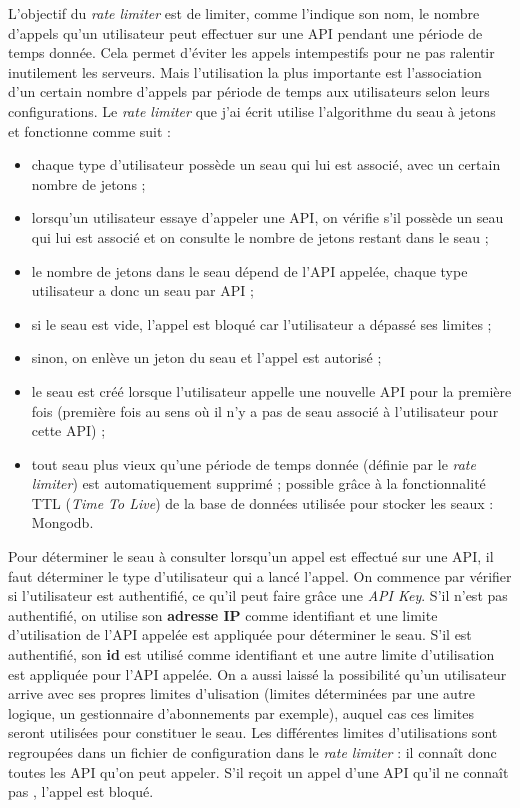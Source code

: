 L'objectif du \textit{rate limiter} est de limiter, comme l'indique son nom, le nombre d'appels qu'un utilisateur peut effectuer sur une API pendant une période de temps donnée. Cela permet d'éviter les appels intempestifs pour ne pas ralentir inutilement les serveurs. Mais l'utilisation la plus importante est l'association d'un certain nombre d'appels par période de temps aux utilisateurs selon leurs configurations. Le \textit{rate limiter} que j'ai écrit utilise l'algorithme du seau à jetons et fonctionne comme suit :
\begin{itemize}[font=\color{blue}, label=]
  \item chaque type d'utilisateur possède un seau qui lui est associé, avec un certain nombre de jetons ;
  \item lorsqu'un utilisateur essaye d'appeler une API, on vérifie s'il possède un seau qui lui est associé et on consulte le nombre de jetons restant dans le seau ;
  \item le nombre de jetons dans le seau dépend de l'API appelée, chaque type utilisateur a donc un seau par API ;
  \item si le seau est vide, l'appel est bloqué car l'utilisateur a dépassé ses limites ;
  \item sinon, on enlève un jeton du seau et l'appel est autorisé ;
  \item le seau est créé lorsque l'utilisateur appelle une nouvelle API pour la première fois (première fois au sens où il n'y a pas de seau associé à l'utilisateur pour cette API) ;
  \item tout seau plus vieux qu'une période de temps donnée (définie par le \textit{rate limiter}) est automatiquement supprimé ; possible grâce à la fonctionnalité TTL (\textit{Time To Live}) de la base de données utilisée pour stocker les seaux : Mongodb.
\end{itemize}

\vspace{3mm}

Pour déterminer le seau à consulter lorsqu'un appel est effectué sur une API, il faut déterminer le type d'utilisateur qui a lancé l'appel. On commence par vérifier si l'utilisateur est authentifié, ce qu'il peut faire grâce une \textit{API Key}. S'il n'est pas authentifié, on utilise son \textbf{adresse IP} comme identifiant et une limite d'utilisation de l'API appelée est appliquée pour déterminer le seau. S'il est authentifié, son \textbf{id} est utilisé comme identifiant et une autre limite d'utilisation est appliquée pour l'API appelée. On a aussi laissé la possibilité qu'un utilisateur arrive avec ses propres limites d'ulisation (limites déterminées par une autre logique, un gestionnaire d'abonnements par exemple), auquel cas ces limites seront utilisées pour constituer le seau. Les différentes limites d'utilisations sont regroupées dans un fichier de configuration dans le \textit{rate limiter} : il connaît donc toutes les API qu'on peut appeler. S'il reçoit un appel d'une API qu'il \og ne connaît pas \fg, l'appel est bloqué.

